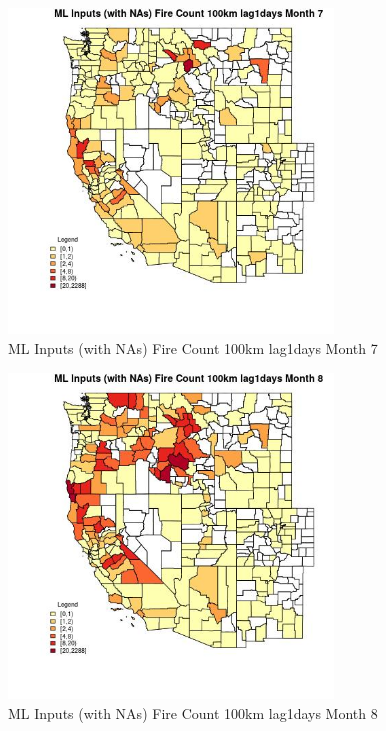 \begin{figure} 
\centering  
\includegraphics[width=0.77\textwidth]{Code_Outputs/Report_ML_input_PM25_Step4_part_e_de_duplicated_aves_compiled_2019-05-20wNAs_CountyFire_Count_100km_lag1daysmedianMonth7.jpg} 
\caption{\label{fig:Report_ML_input_PM25_Step4_part_e_de_duplicated_aves_compiled_2019-05-20wNAsCountyFire_Count_100km_lag1daysmedianMonth7}ML Inputs (with NAs) Fire Count 100km lag1days Month 7} 
\end{figure} 
 

\begin{figure} 
\centering  
\includegraphics[width=0.77\textwidth]{Code_Outputs/Report_ML_input_PM25_Step4_part_e_de_duplicated_aves_compiled_2019-05-20wNAs_CountyFire_Count_100km_lag1daysmedianMonth8.jpg} 
\caption{\label{fig:Report_ML_input_PM25_Step4_part_e_de_duplicated_aves_compiled_2019-05-20wNAsCountyFire_Count_100km_lag1daysmedianMonth8}ML Inputs (with NAs) Fire Count 100km lag1days Month 8} 
\end{figure} 
 

